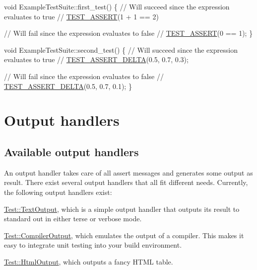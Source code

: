 \begin{DoxyCode}
\textcolor{keywordtype}{void} ExampleTestSuite::first\_test()
\{
    \textcolor{comment}{// Will succeed since the expression evaluates to true}
    \textcolor{comment}{//}
    \hyperlink{cpptest-assert_8h_ac7dd7b06eb85d9ad841d80cbf217b1f6}{TEST\_ASSERT}(1 + 1 == 2)
    
    \textcolor{comment}{// Will fail since the expression evaluates to false}
    \textcolor{comment}{//}
    \hyperlink{cpptest-assert_8h_ac7dd7b06eb85d9ad841d80cbf217b1f6}{TEST\_ASSERT}(0 == 1);
\}

\textcolor{keywordtype}{void} ExampleTestSuite::second\_test()
\{
    \textcolor{comment}{// Will succeed since the expression evaluates to true}
    \textcolor{comment}{//}
    \hyperlink{cpptest-assert_8h_a9583b1709f4b9dfb3ff2849bfec5c885}{TEST\_ASSERT\_DELTA}(0.5, 0.7, 0.3);
    
    \textcolor{comment}{// Will fail since the expression evaluates to false}
    \textcolor{comment}{//}
    \hyperlink{cpptest-assert_8h_a9583b1709f4b9dfb3ff2849bfec5c885}{TEST\_ASSERT\_DELTA}(0.5, 0.7, 0.1);
\}
\end{DoxyCode}
\hypertarget{tutorial_tutorial_output_handlers}{}\section{Output handlers}\label{tutorial_tutorial_output_handlers}
\hypertarget{tutorial_tutorial_available_output_handlers}{}\subsection{Available output handlers}\label{tutorial_tutorial_available_output_handlers}
An output handler takes care of all assert messages and generates some output as result. There exist several output handlers that all fit different needs. Currently, the following output handlers exist\+:
\begin{DoxyItemize}
\item \hyperlink{class_test_1_1_text_output}{Test\+::\+Text\+Output}, which is a simple output handler that outputs its result to standard out in either terse or verbose mode.
\item \hyperlink{class_test_1_1_compiler_output}{Test\+::\+Compiler\+Output}, which emulates the output of a compiler. This makes it easy to integrate unit testing into your build environment.
\item \hyperlink{class_test_1_1_html_output}{Test\+::\+Html\+Output}, which outputs a fancy H\+T\+ML table.
\end{DoxyItemize}

